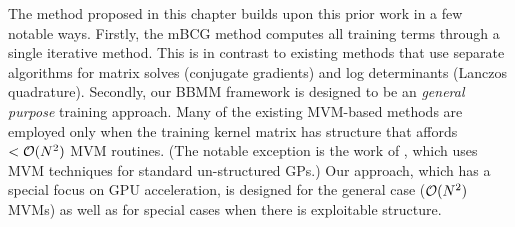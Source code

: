 The method proposed in this chapter builds upon this prior work in a few notable ways.
Firstly, the mBCG method computes all training terms through a single iterative method.
This is in contrast to existing methods that use separate algorithms for matrix solves (conjugate gradients) and log determinants (Lanczos quadrature).
Secondly, our BBMM framework is designed to be an \emph{general purpose} training approach.
Many of the existing MVM-based methods are employed only when the training kernel matrix has structure that affords $< \bigo{N^2}$ MVM routines.
(The notable exception is the work of \citet{cutajar2016preconditioning}, which uses MVM techniques for standard un-structured GPs.)
Our approach, which has a special focus on GPU acceleration, is designed for the general case ($\bigo{N^2}$ MVMs) as well as for special cases when there is exploitable structure.
